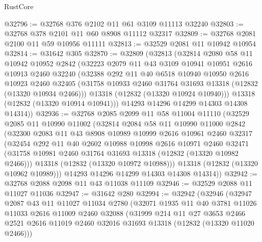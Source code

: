 \begin{lexlean}{RustCore}
\begin{coremodule}
@32796 := @32768 @376 @2102 @11 @61 @3109 @11113 @32240
@32803 := @32768 @378 @2101 @11 @60 @8908 @11112 @32317
@32809 := @32768 @2081 @2100 @11 @59 @10956 @11111
@32813 := @32529 @2081 @11 @10942 @10954
@32814 := @31642 @305
@32870 := @32809
    (@32813
      (@32814
        @2080
        @58
        @11
        @10942
        @10952
        @2842
        (@32223
          @2079
          @11
          @43
          @3109
          @10941
          @10951
          @2616
          @10913
          @2460
          @32240
          (@32388
            @292
            @11
            @40
            @6518
            @10940
            @10950
            @2616
            @10923
            @2460
            @32405
            (@31758 @10933 @2460 @31764 @31693 @13318 (@12832 (@13320 @10934 @2466)))
            @13318
            (@12832 (@13320 @10924 @10940)))
          @13318
          (@12832 (@13320 @10914 @10941)))
        @14293
        @14296
        @14299
        @14303
        @14308
        @14314))
@32936 := @32768
    @2085
    @2099
    @11
    @58
    @11004
    @11110
    (@32529
      @2085
      @11
      @10990
      @11002
      (@32814
        @2084
        @58
        @11
        @10990
        @11000
        @2842
        (@32300
          @2083
          @11
          @43
          @8908
          @10989
          @10999
          @2616
          @10961
          @2460
          @32317
          (@32454
            @292
            @11
            @40
            @2602
            @10988
            @10998
            @2616
            @10971
            @2460
            @32471
            (@31758 @10981 @2460 @31764 @31693 @13318 (@12832 (@13320 @10982 @2466)))
            @13318
            (@12832 (@13320 @10972 @10988)))
          @13318
          (@12832 (@13320 @10962 @10989)))
        @14293
        @14296
        @14299
        @14303
        @14308
        @14314))
@32942 := @32768 @2088 @2098 @11 @43 @11038 @11109
@32946 := @32529 @2088 @11 @11027 @11036
@32947 := @31642 @280
@32994 := @32942
    (@32946
      (@32947
        @2087
        @43
        @11
        @11027
        @11034
        @2780
        (@32071
          @1935
          @11
          @40
          @3781
          @11026
          @11033
          @2616
          @11009
          @2460
          @32088
          (@31999
            @214
            @11
            @27
            @3653
            @2466
            @2521
            @2616
            @11019
            @2460
            @32016
            @31693
            @13318
            (@12832 (@13320 @11020 @2466)))

\end{coremodule}
\end{lexlean}

